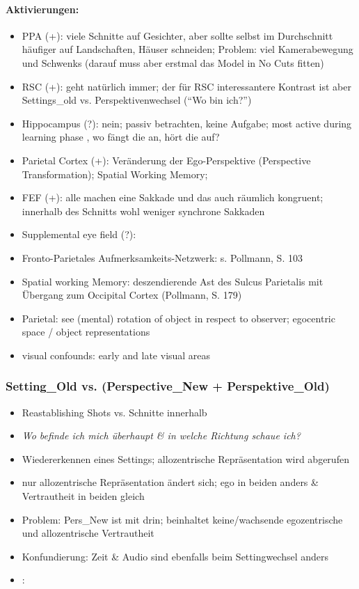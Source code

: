 \documentclass[10pt,a4paper,twocolumn]{article}
\begin{document}
\paragraph*{Aktivierungen:}
\begin{itemize}
	\item PPA (+): viele Schnitte auf Gesichter, aber sollte selbst im Durchschnitt
	häufiger auf Landschaften, Häuser schneiden; Problem: viel Kamerabewegung
	und Schwenks (darauf muss aber erstmal das Model in No Cuts fitten)
	\item RSC (+): geht natürlich immer; der für RSC interessantere Kontrast
	ist aber Settings\_old vs. Perspektivenwechsel (``Wo bin ich?'')
	\item Hippocampus (?): nein; passiv betrachten, keine Aufgabe; most active
	during learning phase \citep{wolbers_2005_retrosplenial_hippocampal_contributions},
	wo fängt die an, hört die auf? 
	\item Parietal Cortex (+): Veränderung der Ego-Perspektive (Perspective
	Transformation); Spatial Working Memory; 
	\item FEF (+): alle machen eine Sakkade und das auch räumlich kongruent;
	innerhalb des Schnitts wohl weniger synchrone Sakkaden
	\item Supplemental eye field (?):
	\item Fronto-Parietales Aufmerksamkeits-Netzwerk: s. Pollmann, S. 103
	\item Spatial working Memory: deszendierende Ast des Sulcus Parietalis mit
	Übergang zum Occipital Cortex (Pollmann, S. 179)
	\item Parietal: see (mental) rotation of object in respect to observer;
	egocentric space / object representations
	\item visual confounds: early and late visual areas
\end{itemize}

\subsubsection{Setting\_Old vs. (Perspective\_New + Perspektive\_Old) }
\begin{itemize}
	\item Reastablishing Shots vs. Schnitte innerhalb
	\item \emph{Wo befinde ich mich überhaupt \& in welche Richtung schaue ich?}
	\item Wiedererkennen eines Settings; allozentrische Repräsentation wird
	abgerufen
	\item nur allozentrische Repräsentation ändert sich; ego in beiden anders
	\& Vertrautheit in beiden gleich 
	\item Problem: Pers\_New ist mit drin; beinhaltet keine/wachsende egozentrische
	und allozentrische Vertrautheit
	\item Konfundierung: Zeit \& Audio sind ebenfalls beim Settingwechsel anders
	\item \citet{smith_2012_window_to_reality}: 
\end{itemize}
\end{document}
